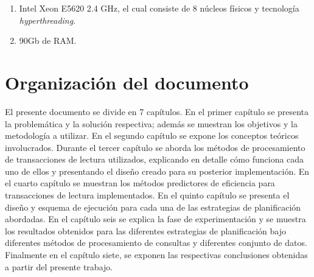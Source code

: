 \begin{enumerate}
  \item Intel Xeon E5620 2.4 GHz, el cual consiste de 8 núcleos físicos y tecnología \textit{hyperthreading}. 
  \item 90Gb de RAM.
\end{enumerate}

\section{Organización del documento}
\label{intro:organizaciondocumento}
El presente documento se divide en 7 capítulos. En el primer capítulo se presenta la problemática y la solución respectiva; además se muestran los objetivos y la metodología a utilizar. En el segundo capítulo se expone los conceptos teóricos involucrados. Durante el tercer capítulo se aborda los métodos de procesamiento de transacciones de lectura utilizados, explicando en detalle cómo funciona cada uno de ellos y presentando el diseño creado para su posterior implementación. En el cuarto capítulo se muestran los métodos predictores de eficiencia para transacciones de lectura implementados. En el quinto capítulo se presenta el diseño y esquema de ejecución para cada una de las estrategias de planificación abordadas. En el capítulo seis se explica la fase de experimentación y se muestra los resultados obtenidos para las diferentes estrategias de planificación bajo diferentes métodos de procesamiento de consultas y diferentes conjunto de datos. Finalmente en el capítulo siete, se exponen las respectivas conclusiones obtenidas a partir del presente trabajo.